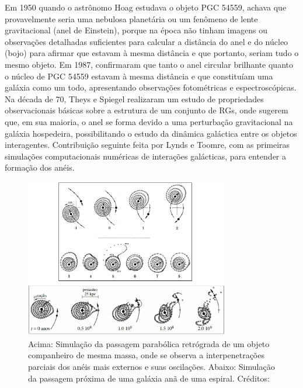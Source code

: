 Em 1950 quando o astrônomo Hoag estudava o objeto PGC 54559, achava que provavelmente seria uma nebulosa planetária ou um fenômeno de lente gravitacional (anel de Einstein), porque na época não tinham imagens ou observações detalhadas suficientes para calcular a distância do anel e do núcleo (bojo) para afirmar que estavam à mesma distância e que portanto, seriam tudo o mesmo objeto. Em 1987,  confirmaram que tanto o anel circular brilhante quanto o núcleo de PGC 54559 estavam à mesma distância e que constituíam uma galáxia como um todo, apresentando observações fotométricas e espectroscópicas. Na década de 70, Theys e Spiegel realizaram um estudo de propriedades observacionais básicas sobre a estrutura de um conjunto de RGs, onde sugerem que, em sua maioria, o anel se forma devido a uma perturbação gravitacional na galáxia hospedeira, possibilitando o estudo da dinâmica galáctica entre os objetos interagentes. Contribuição seguinte feita por Lynds e Toomre, com as primeiras simulações computacionais numéricas de interações galácticas, para entender a formação dos anéis.

\begin{figure}[h]
  \centering 
  \includegraphics[width=0.8\textwidth]{Imagens/tmtmsimu.png} 
  \caption[Simulação de partículas teste.]{Acima: Simulação da passagem parabólica retrógrada de um objeto companheiro de mesma massa, onde se observa a interpenetrações parciais dos anéis mais externos e suas oscilações. Abaixo: Simulação da passagem próxima de uma galáxia anã de uma espiral. Créditos: \cite{1972ApJ...178..623T}}
  \label{fig:simulacaotmtm} 
\end{figure}

